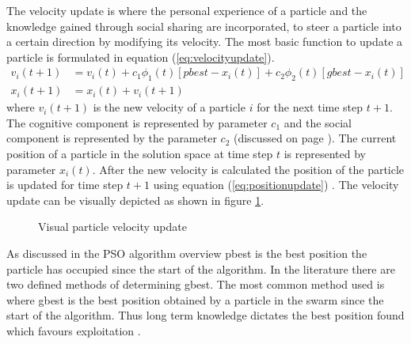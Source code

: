 The velocity update is where the personal experience of a particle and the knowledge gained through social sharing are incorporated, to steer a particle into a certain direction by modifying its velocity. The most basic function to update a particle is formulated in equation (\ref{eq:velocityupdate}).
\begin{align}
v_i(t+1) &= v_i(t) + c_1\phi_{1}(t)[pbest - x_i(t)] + c_2\phi_{2}(t)[gbest - x_i(t)]\label{eq:velocityupdate}\\
x_i(t+1) &= x_i(t) + v_i(t+1)\label{eq:positionupdate}
\end{align}
where $v_i(t+1)$ is the new velocity of a particle $i$ for the next time step $t+1$. The cognitive component is represented by parameter $c_1$ and the social component is represented by the parameter $c_2$ (discussed on page \pageref{def:cognitivecomponent})\cite{FundamentalSwarm,CompuIntelligenceIntro}. The current position of a particle in the solution space at time step $t$ is represented by parameter $x_i(t)$\cite{FundamentalSwarm,CompuIntelligenceIntro}. After the new velocity is calculated the position of the particle is updated for time step $t+1$ using equation (\ref{eq:positionupdate}) \cite{FundamentalSwarm,CompuIntelligenceIntro}. The velocity update can be visually depicted as shown in figure \ref{fig:particleVelocityUpdate}. 
\begin{figure}[h]
	\centering
	\setlength \fboxsep{0pt}
	\setlength \fboxrule{0.5pt}
	\caption{Visual particle velocity update \cite{SOSwarm,FundamentalSwarm,CompuIntelligenceIntro,PSOSelfHierarch}}

	\label{fig:particleVelocityUpdate}
\end{figure}

As discussed in the PSO algorithm overview pbest is the best position the particle has occupied since the start of the algorithm. In the literature there are two defined methods of determining gbest. The most common method used is where gbest is the best position obtained by a particle in the swarm since the start of the algorithm. Thus long term knowledge dictates the best position found which favours exploitation \cite{CompuIntelligenceIntro,FundamentalSwarm}.

